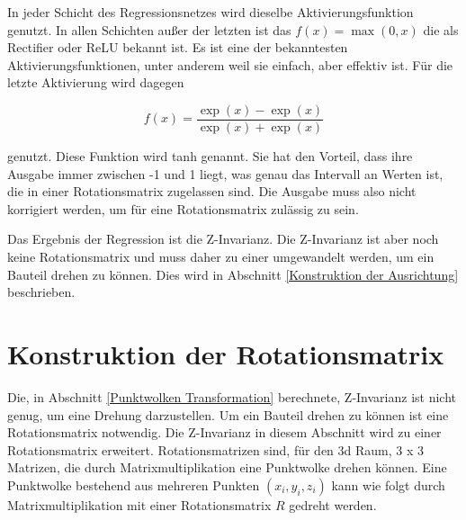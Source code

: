 \smallskip

In jeder Schicht des Regressionsnetzes wird dieselbe Aktivierungsfunktion genutzt. In allen Schichten außer der letzten ist das $f(x) = \max(0,x)$ die als Rectifier oder ReLU bekannt ist. 
Es ist eine der bekanntesten Aktivierungsfunktionen, unter anderem weil sie einfach, aber effektiv ist. Für die letzte Aktivierung wird dagegen 

\begin{equation}
    f(x) = \frac{\exp(x) - \exp(x)}{\exp(x) + \exp(x)}
\end{equation}

genutzt. Diese Funktion wird tanh genannt.
Sie hat den Vorteil, dass ihre Ausgabe immer zwischen -1 und 1 liegt, was genau das Intervall an Werten ist, die in einer Rotationsmatrix zugelassen sind. Die Ausgabe muss also nicht korrigiert werden, um für eine Rotationsmatrix zulässig zu sein.

\smallskip

Das Ergebnis der Regression ist die Z-Invarianz.
Die Z-Invarianz ist aber noch keine Rotationsmatrix und muss daher zu einer umgewandelt werden, um ein Bauteil drehen zu können.
Dies wird in Abschnitt \ref{Konstruktion der Ausrichtung} beschrieben.


\section{Konstruktion der Rotationsmatrix}
\label{Konstruktion der Rotationsmatrix} %

Die, in Abschnitt \ref{Punktwolken Transformation} berechnete, Z-Invarianz ist nicht genug, um eine Drehung darzustellen. Um ein Bauteil drehen zu können ist eine Rotationsmatrix notwendig. Die Z-Invarianz in diesem Abschnitt wird zu einer Rotationsmatrix erweitert.
Rotationsmatrizen sind, für den 3d Raum, 3 x 3 Matrizen, die durch Matrixmultiplikation eine Punktwolke drehen können.
Eine Punktwolke bestehend aus mehreren Punkten  $(x_{i},y_{i},z_{i})$ kann wie folgt durch Matrixmultiplikation mit einer Rotationsmatrix $R$ gedreht werden.

